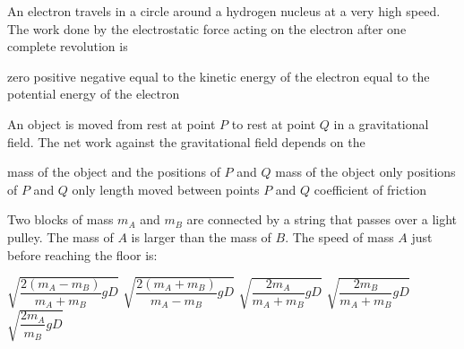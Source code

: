 \documentclass{../../oss-apphys-exam}
\begin{document}
\begin{multicols*}{2}
\begin{multicols*}{2}
\begin{questions}
    \question An electron travels in a circle around a hydrogen nucleus at a
    very high speed. The work done by the electrostatic force acting on the
    electron after one complete revolution is
    \begin{choices}
      \choice zero
      \choice positive
      \choice negative
      \choice equal to the kinetic energy of the electron
      \choice equal to the potential energy of the electron
    \end{choices}
    \vspace{.7in}
    
    \question An object is moved from rest at point $P$ to rest at point $Q$ in
    a gravitational field. The net work against the gravitational field depends
    on the
    \begin{choices}
      \choice mass of the object and the positions of $P$ and $Q$
      \choice mass of the object only
      \choice positions of $P$ and $Q$ only
      \choice length moved between points $P$ and $Q$
      \choice coefficient of friction
    \end{choices}
    \vspace{.7in}

    \question Two blocks of mass $m_A$ and $m_B$ are connected by a string that
    passes over a light pulley. The mass of $A$ is larger than the mass of $B$.
    The speed of mass $A$ just before reaching the floor is:
    \begin{center}
    \end{center}
    \begin{choices}
      \choice $\sqrt{\dfrac{2(m_A-m_B)}{m_A+m_B}gD}$
      \choice $\sqrt{\dfrac{2(m_A+m_B)}{m_A-m_B}gD}$
      \choice $\sqrt{\dfrac{2m_A}{m_A+m_B}gD}$
      \choice $\sqrt{\dfrac{2m_B}{m_A+m_B}gD}$
      \choice $\sqrt{\dfrac{2m_A}{m_B}gD}$
    \end{choices}
    


\end{questions}
\end{multicols*}
\end{multicols*}
\end{document}

